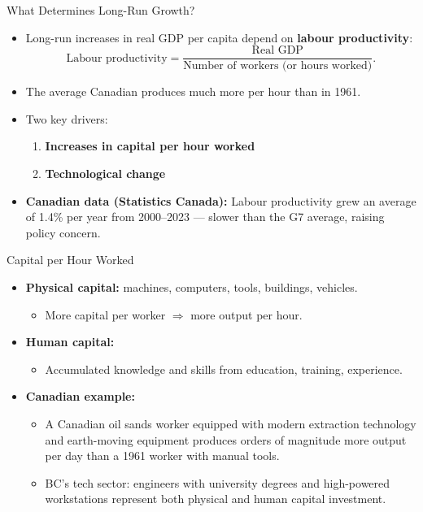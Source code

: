 \documentclass[aspectratio=169]{beamer}
\begin{document}

\begin{frame}{What Determines Long-Run Growth?}
\transfade
\begin{itemize}[<+->]
  \item Long-run increases in real GDP per capita depend on \textbf{labour productivity}:
  \[
    \text{Labour productivity} = \frac{\text{Real GDP}}{\text{Number of workers (or hours worked)}}.
  \]
  \item The average Canadian produces much more per hour than in 1961.
  \item Two key drivers:
  \begin{enumerate}[<+->]
    \item \textbf{Increases in capital per hour worked}
    \item \textbf{Technological change}
  \end{enumerate}
  \item \textbf{Canadian data (Statistics Canada):} Labour productivity grew an average of \alert{1.4\%} per year from 2000--2023 --- slower than the G7 average, raising policy concern.
\end{itemize}
\end{frame}

\begin{frame}{Capital per Hour Worked}
\transfade
\begin{itemize}[<+->]
  \item \textbf{Physical capital:} machines, computers, tools, buildings, vehicles.
  \begin{itemize}[<+->]
    \item More capital per worker $\Rightarrow$ more output per hour.
  \end{itemize}
  \item \textbf{Human capital:}
  \begin{itemize}[<+->]
    \item Accumulated knowledge and skills from education, training, experience.
  \end{itemize}
  \item \textbf{Canadian example:}
  \begin{itemize}[<+->]
    \item A Canadian oil sands worker equipped with modern extraction technology and earth-moving equipment produces orders of magnitude more output per day than a 1961 worker with manual tools.
    \item BC's tech sector: engineers with university degrees and high-powered workstations represent both physical and human capital investment.
  \end{itemize}
\end{itemize}
\end{frame}
\end{document}
